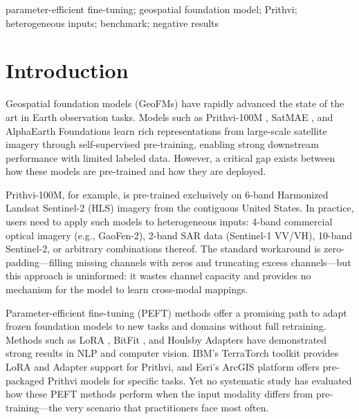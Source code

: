\documentclass{article}
\begin{document}
\begin{keywords}
parameter-efficient fine-tuning; geospatial foundation model; Prithvi; heterogeneous inputs; benchmark; negative results
\end{keywords}

\section{Introduction}
\label{sec:intro}

Geospatial foundation models (GeoFMs) have rapidly advanced the state of the art in Earth observation tasks. Models such as Prithvi-100M \citep{jakubik2024prithvi}, SatMAE \citep{cong2022satmae}, and AlphaEarth Foundations \citep{brown2025alphaearth} learn rich representations from large-scale satellite imagery through self-supervised pre-training, enabling strong downstream performance with limited labeled data. However, a critical gap exists between how these models are pre-trained and how they are deployed.

Prithvi-100M, for example, is pre-trained exclusively on 6-band Harmonized Landsat Sentinel-2 (HLS) imagery from the contiguous United States. In practice, users need to apply such models to heterogeneous inputs: 4-band commercial optical imagery (e.g., GaoFen-2), 2-band SAR data (Sentinel-1 VV/VH), 10-band Sentinel-2, or arbitrary combinations thereof. The standard workaround is zero-padding---filling missing channels with zeros and truncating excess channels---but this approach is uninformed: it wastes channel capacity and provides no mechanism for the model to learn cross-modal mappings.

Parameter-efficient fine-tuning (PEFT) methods offer a promising path to adapt frozen foundation models to new tasks and domains without full retraining. Methods such as LoRA \citep{hu2022lora}, BitFit \citep{zaken2022bitfit}, and Houlsby Adapters \citep{houlsby2019adapter} have demonstrated strong results in NLP and computer vision. IBM's TerraTorch toolkit \citep{ibm2025terratorch} provides LoRA and Adapter support for Prithvi, and Esri's ArcGIS platform offers pre-packaged Prithvi models for specific tasks. Yet no systematic study has evaluated how these PEFT methods perform when the input modality differs from pre-training---the very scenario that practitioners face most often.
\end{document}
